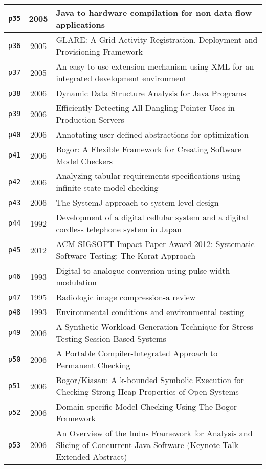 \begin{longtable}{| c | c | p{16cm} |}
  \hline
  \texttt{p35} & 2005 & Java to hardware compilation for non data flow applications \\
  \hline
  \texttt{p36} & 2005 & GLARE: A Grid Activity Registration, Deployment and Provisioning Framework \\
  \hline
  \texttt{p37} & 2005 & An easy-to-use extension mechanism using XML for an integrated development environment \\
  \hline
  \texttt{p38} & 2006 & Dynamic Data Structure Analysis for Java Programs \\
  \hline
  \texttt{p39} & 2006 & Efficiently Detecting All Dangling Pointer Uses in Production Servers \\
  \hline
  \texttt{p40} & 2006 & Annotating user-defined abstractions for optimization \\
  \hline
  \texttt{p41} & 2006 & Bogor: A Flexible Framework for Creating Software Model Checkers \\
  \hline
  \texttt{p42} & 2006 & Analyzing tabular requirements specifications using infinite state model checking \\
  \hline
  \texttt{p43} & 2006 & The SystemJ approach to system-level design \\
  \hline
  \texttt{p44} & 1992 & Development of a digital cellular system and a digital cordless telephone system in Japan \\
  \hline
  \texttt{p45} & 2012 & ACM SIGSOFT Impact Paper Award 2012: Systematic Software Testing: The Korat Approach \\
  \hline
  \texttt{p46} & 1993 & Digital-to-analogue conversion using pulse width modulation \\
  \hline
  \texttt{p47} & 1995 & Radiologic image compression-a review \\
  \hline
  \texttt{p48} & 1993 & Environmental conditions and environmental testing \\
  \hline
  \texttt{p49} & 2006 & A Synthetic Workload Generation Technique for Stress Testing Session-Based Systems \\
  \hline
  \texttt{p50} & 2006 & A Portable Compiler-Integrated Approach to Permanent Checking \\
  \hline
  \texttt{p51} & 2006 & Bogor/Kiasan: A k-bounded Symbolic Execution for Checking Strong Heap Properties of Open Systems \\
  \hline
  \texttt{p52} & 2006 & Domain-specific Model Checking Using The Bogor Framework \\
  \hline
  \texttt{p53} & 2006 & An Overview of the Indus Framework for Analysis and Slicing of Concurrent Java Software (Keynote Talk - Extended Abstract) \\

\end{longtable}
